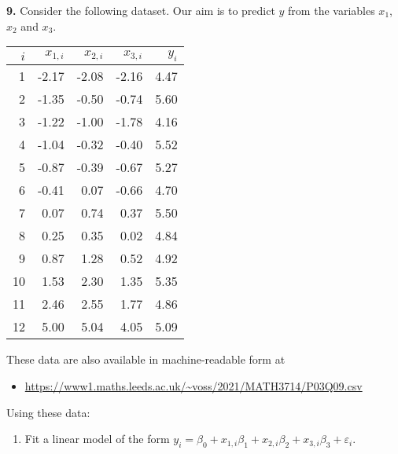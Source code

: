 \documentclass[
  a4paper,
]{article}
\providecommand{\tightlist}{%
  \setlength{\itemsep}{0pt}\setlength{\parskip}{0pt}}
\theoremstyle{definition}
\theoremstyle{definition}
\theoremstyle{definition}
\theoremstyle{definition}
\theoremstyle{remark}
\begin{document}
\textbf{9.} Consider the following dataset. Our aim is to predict \(y\) from the
variables \(x_1\), \(x_2\) and \(x_3\).

\begin{longtable}[]{@{}rrrrr@{}}
\toprule()
\(i\) & \(x_{1,i}\) & \(x_{2,i}\) & \(x_{3,i}\) & \(y_i\) \\
\midrule()
\endhead
1 & -2.17 & -2.08 & -2.16 & 4.47 \\
2 & -1.35 & -0.50 & -0.74 & 5.60 \\
3 & -1.22 & -1.00 & -1.78 & 4.16 \\
4 & -1.04 & -0.32 & -0.40 & 5.52 \\
5 & -0.87 & -0.39 & -0.67 & 5.27 \\
6 & -0.41 & 0.07 & -0.66 & 4.70 \\
7 & 0.07 & 0.74 & 0.37 & 5.50 \\
8 & 0.25 & 0.35 & 0.02 & 4.84 \\
9 & 0.87 & 1.28 & 0.52 & 4.92 \\
10 & 1.53 & 2.30 & 1.35 & 5.35 \\
11 & 2.46 & 2.55 & 1.77 & 4.86 \\
12 & 5.00 & 5.04 & 4.05 & 5.09 \\
\bottomrule()
\end{longtable}

These data are also available in machine-readable form at

\begin{itemize}
\tightlist
\item
  \url{https://www1.maths.leeds.ac.uk/~voss/2021/MATH3714/P03Q09.csv}
\end{itemize}

Using these data:

\begin{enumerate}
\def\labelenumi{\alph{enumi}.}
\tightlist
\item
  Fit a linear model of the form
  \(y_i = \beta_0 + x_{1,i} \beta_1 + x_{2,i} \beta_2 + x_{3,i} \beta_3 + \varepsilon_i\).
\end{enumerate}
\end{document}
